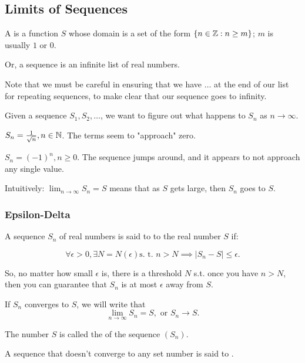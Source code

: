 \documentclass{book}
\begin{document}
\subsection{Limits of Sequences}
\begin{defn}[Sequence]
    A  is a function $S$ whose domain is a set of the form $\{n \in \mathbb{Z} : n \geq m\}$; $m$ is usually $1$ or $0$.

    Or, a sequence is an infinite list of real numbers.
\end{defn}

Note that we must be careful in ensuring that we have $\ldots$ at the end of our list for repeating sequences, to make clear that our sequence goes to infinity.

Given a sequence $S_1, S_2, \ldots$, we want to figure out what happens to $S_n$ as $n \to \infty$. 

\begin{ex}
    $S_n = \frac{1}{\sqrt n}, n \in \mathbb{N}$. The terms seem to "approach" zero.
\end{ex}

\begin{ex}
    $S_n = (-1)^n, n \geq 0$. The sequence jumps around, and it appears to not approach any single value.
\end{ex}

Intuitively: $\lim_{n \to \infty} S_n = S$ means that as $S$ gets large, then $S_n$ goes to $S$.

\subsubsection{Epsilon-Delta}

\begin{defn}
    A sequence $S_n$ of real numbers is said to  to the real number $S$ if:

    \[\forall \epsilon > 0, \exists N = N(\epsilon) \textrm{s. t. } n > N \implies |S_n - S| \leq \epsilon.\]
\end{defn}
So, no matter how small $\epsilon$ is, there is a threshold $N$ s.t. once you have $n > N$, then you can guarantee that $S_n$ is at most $\epsilon$ away from $S$.

\begin{defn}[Limits]
    If $S_n$ converges to $S$, we will write that \[\lim_{n \to \infty} S_n = S, \text{ or } S_n \to S.\] 

    The number $S$ is called the  of the sequence $(S_n)$. 

    A sequence that doesn't converge to any set number is said to .
\end{defn}
\end{document}
